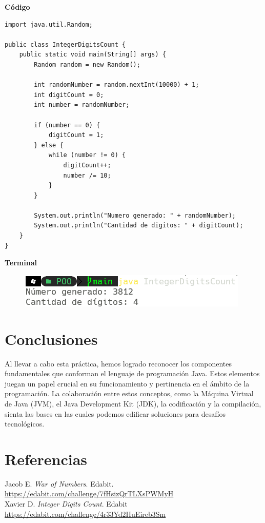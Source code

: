 \documentclass[11pt, twocolumn]{article}
\begin{document}
    \textbf{Código}
    \begin{lstlisting}
import java.util.Random;

public class IntegerDigitsCount {
    public static void main(String[] args) {
        Random random = new Random();

        int randomNumber = random.nextInt(10000) + 1;
        int digitCount = 0;
        int number = randomNumber;
        
        if (number == 0) {
            digitCount = 1;
        } else {
            while (number != 0) {
                digitCount++;
                number /= 10;
            }
        }

        System.out.println("Numero generado: " + randomNumber);
        System.out.println("Cantidad de digitos: " + digitCount);  
    }  
}
    \end{lstlisting}

    \textbf{Terminal}
    \begin{figure}[ht]
        \includegraphics[width=0.75\columnwidth, center]{P5.png}
    \end{figure}


    \section*{Conclusiones}
    Al llevar a cabo esta práctica, hemos logrado reconocer los componentes fundamentales que conforman el lenguaje de programación Java. Estos elementos juegan un papel crucial en su funcionamiento y pertinencia en el ámbito de la programación. La colaboración entre estos conceptos, como la Máquina Virtual de Java (JVM), el Java Development Kit (JDK), la codificación y la compilación, sienta las bases en las cuales podemos edificar soluciones para desafíos tecnológicos.


    \section*{Referencias}
    \small
    Jacob E. \textit{War of Numbers}. Edabit. \url{https://edabit.com/challenge/7fHsizQrTLXsPWMyH} \\

    Xavier D. \textit{Integer Digits Count}. Edabit \url{https://edabit.com/challenge/4r33Yd2HuEireb3Sm}
\end{document}
